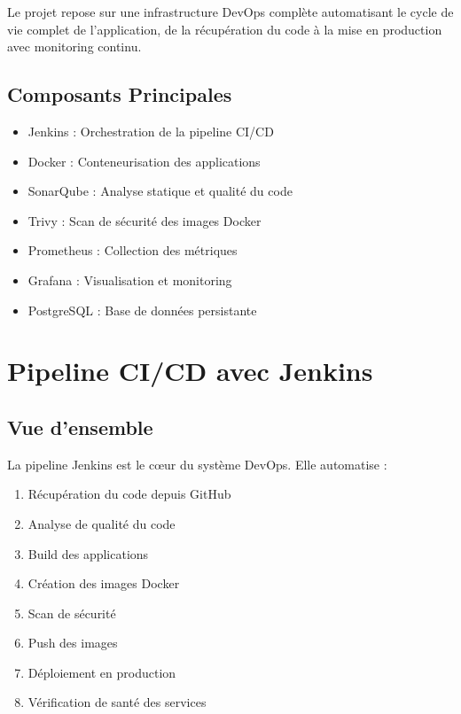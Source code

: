 \documentclass[12pt,a4paper]{report}
\begin{document}
Le projet repose sur une infrastructure DevOps complète automatisant le cycle de vie complet de l'application, de la récupération du code à la mise en production avec monitoring continu.

\subsection{Composants Principales}

\begin{itemize}
    \item Jenkins : Orchestration de la pipeline CI/CD
    \item Docker : Conteneurisation des applications
    \item SonarQube : Analyse statique et qualité du code
    \item Trivy : Scan de sécurité des images Docker
    \item Prometheus : Collection des métriques
    \item Grafana : Visualisation et monitoring
    \item PostgreSQL : Base de données persistante
\end{itemize}

\section{Pipeline CI/CD avec Jenkins}

\subsection{Vue d'ensemble}

La pipeline Jenkins est le cœur du système DevOps. Elle automatise :

\begin{enumerate}
    \item Récupération du code depuis GitHub
    \item Analyse de qualité du code
    \item Build des applications
    \item Création des images Docker
    \item Scan de sécurité
    \item Push des images
    \item Déploiement en production
    \item Vérification de santé des services
\end{enumerate}
\end{document}
